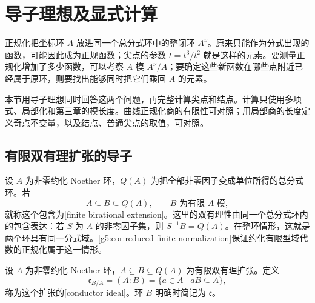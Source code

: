 
% 
% 

\section{导子理想及显式计算}
\label{g5:sec:0403}

正规化把坐标环 \(A\) 放进同一个总分式环中的整闭环 \(A^\nu\)。原来只能作为分式出现的函数，可能因此成为正规函数；尖点的参数 \(t=t^3/t^2\) 就是这样的元素。要测量正规化增加了多少函数，可以考察 \(A\) 模 \(A^\nu/A\)；要确定这些新函数在哪些点附近已经属于原环，则要找出能够同时把它们乘回 \(A\) 的元素。

\ProseParagraphBreak

本节用导子理想同时回答这两个问题，再完整计算尖点和结点。计算只使用多项式、局部化和第三章的模长度。曲线正规化商的有限性可对照\cite[第4章第4.1节，定理4.11的证明，第271页]{Shafarevich2013Basic1}；用局部商的长度定义奇点不变量，以及结点、普通尖点的取值，可对照\cite[第IV章，习题1.8，第298页]{Hartshorne1977}。

\subsection{有限双有理扩张的导子}
\label{g5:subsec:0403:01}

设 \(A\) 为非零约化 Noether 环，\(Q(A)\) 为把全部非零因子变成单位所得的总分式环。若
\[
	A\subseteq B\subseteq Q(A),\qquad B\text{ 为有限 }A\text{ 模},
\]
就称这个包含为[finite birational extension]。这里的双有理性由同一个总分式环内的包含表达：若 \(S\) 为 \(A\) 的非零因子集，则 \(S^{-1}B=Q(A)\)。在整环情形，这就是两个环具有同一分式域。\cref{g5:cor:reduced-finite-normalization}保证约化有限型域代数的正规化属于这一情形。

\begin{definition}\label{g5:def:conductor}
	设 \(A\) 为非零约化 Noether 环，\(A\subseteq B\subseteq Q(A)\) 为有限双有理扩张。定义
	\[
	\mathfrak c_{B/A}=(A:B)
	=\{a\in A\mid aB\subseteq A\},
	\]
	称为这个扩张的[conductor ideal]。环 \(B\) 明确时简记为 \(\mathfrak c\)。
\end{definition}

